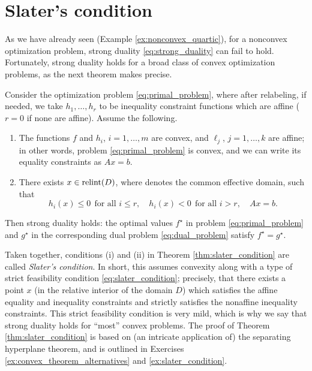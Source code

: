 \section{Slater's condition}
\label{sec:slater_condition}

As we have already seen (Example \ref{ex:nonconvex_quartic}), for a nonconvex 
optimization problem, strong duality \eqref{eq:strong_duality} can fail to
hold. Fortunately, strong duality holds for a broad class of convex optimization
problems, as the next theorem makes precise.  

\begin{Theorem}
\label{thm:slater_condition}
Consider the optimization problem \eqref{eq:primal_problem}, where after 
relabeling, if needed, we take $h_1, \dots, h_r$ to be inequality constraint
functions which are affine ($r = 0$ if none are affine). Assume the following.         

\begin{enumerate}[label=(\roman*)]
\item The functions $f$ and $h_i$, $i=1,\dots,m$ are convex, and $\ell_j$,
  $j=1,\dots,k$ are affine; in other words, problem \eqref{eq:primal_problem} is
  convex, and we can write its equality constraints as $Ax = b$.      

\item There exists $x \in \operatorname{relint}(D)$, where  denotes the common effective domain, such that      
  \begin{equation}
  \label{eq:slater_condition}
  h_i(x) \leq 0 \;\, \text{for all $i \leq r$}, \quad
  h_i(x) < 0 \;\, \text{for all $i > r$}, \quad Ax = b. 
  \end{equation}
\end{enumerate}

Then strong duality holds: the optimal values $f^\star$ in problem
\eqref{eq:primal_problem} and $g^\star$ in the corresponding dual problem  
\eqref{eq:dual_problem} satisfy $f^\star = g^\star$. 
\end{Theorem}

Taken together, conditions (i) and (ii) in Theorem \ref{thm:slater_condition}
are called \emph{Slater's condition}. In short, this assumes convexity along  
with a type of strict feasibility condition \eqref{eq:slater_condition};
precisely, that there exists a point $x$ (in the relative interior of the domain
$D$) which satisfies the affine equality and inequality constraints and strictly
satisfies the nonaffine inequality constraints. This strict feasibility
condition is very mild, which is why we say that strong duality holds for
``most'' convex problems. The proof of Theorem \ref{thm:slater_condition} is
based on (an intricate application of) the separating hyperplane theorem, and is
outlined in Exercises \ref{ex:convex_theorem_alternatives} and
\ref{ex:slater_condition}.    

